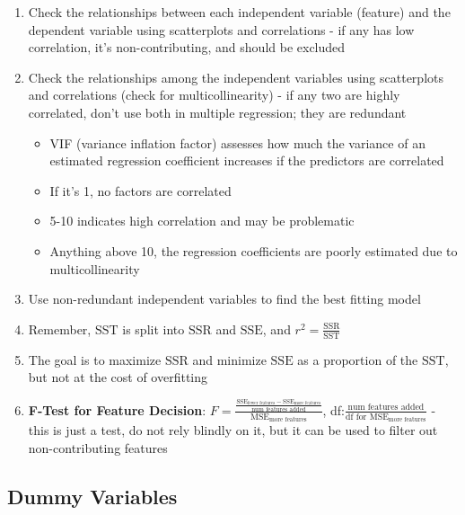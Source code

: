 \documentclass{article}
\begin{document}
\begin{enumerate}
    \item Check the relationships between each independent variable (feature) and the dependent variable using scatterplots and correlations - if any has low correlation, it's non-contributing, and should be excluded
    \item Check the relationships among the independent variables using scatterplots and correlations (check for multicollinearity) - if any two are highly correlated, don't use both in multiple regression; they are redundant
    \begin{itemize}
        \item VIF (variance inflation factor) assesses how much the variance of an estimated regression coefficient increases if the predictors are correlated
        \item If it's 1, no factors are correlated
        \item 5-10 indicates high correlation and may be problematic
        \item Anything above 10, the regression coefficients are poorly estimated due to multicollinearity
    \end{itemize}
    \item Use non-redundant independent variables to find the best fitting model
    \item Remember, $\text{SST}$ is split into $\text{SSR}$ and $\text{SSE}$, and $r^2=\frac{\text{SSR}}{\text{SST}}$
    \item The goal is to maximize $\text{SSR}$ and minimize $\text{SSE}$ as a proportion of the $\text{SST}$, but not at the cost of overfitting
    \item \textbf{F-Test for Feature Decision}: $F=\frac{\frac{\text{SSE}_{\text{fewer features}}-\text{SSE}_{\text{more features}}}{\text{num features added}}}{\text{MSE}_{\text{more features}}}$, df:$\frac{\text{num features added}}{\text{df for MSE}_{\text{more features}}}$ - this is just a test, do not rely blindly on it, but it can be used to filter out non-contributing features
\end{enumerate}

\subsection{Dummy Variables}
\end{document}
